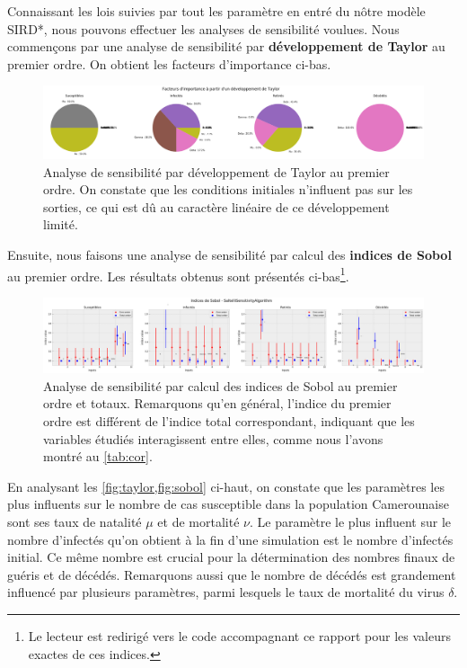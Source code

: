 \documentclass[
  french,
	10pt, %
]{fphw}
\begin{document}
Connaissant les lois suivies par tout les paramètre en entré du nôtre modèle SIRD*, nous pouvons effectuer les analyses de sensibilité voulues. Nous commençons par une analyse de sensibilité par \textbf{développement de Taylor} au premier ordre. On obtient les facteurs d'importance ci-bas. 
\begin{figure}[H]
  \centering
  \includegraphics[width=\linewidth]{taylor.png}
  \caption{Analyse de sensibilité par développement de Taylor au premier ordre. On constate que les conditions initiales n'influent pas sur les sorties, ce qui est dû au caractère linéaire de ce développement limité.}
  \label{fig:taylor}
\end{figure}

Ensuite, nous faisons une analyse de sensibilité par calcul des \textbf{indices de Sobol} au premier ordre. Les résultats obtenus sont présentés ci-bas\footnote{Le lecteur est redirigé vers le code accompagnant ce rapport pour les valeurs exactes de ces indices.}.
\begin{figure}[H]
  \centering
  \includegraphics[width=\linewidth]{sobol.png}
  \caption{Analyse de sensibilité par calcul des indices de Sobol au premier ordre et totaux. Remarquons qu'en général, l'indice du premier ordre est différent de l'indice total correspondant, indiquant que les variables étudiés interagissent entre elles, comme nous l'avons montré au \cref{tab:cor}.}
  \label{fig:sobol}
\end{figure}

En analysant les \cref{fig:taylor,fig:sobol} ci-haut, on constate que les paramètres les plus influents sur le nombre de cas susceptible dans la population Camerounaise sont ses taux de natalité $\mu$ et de mortalité $\nu$. Le paramètre le plus influent sur le nombre d'infectés qu'on obtient à la fin d'une simulation est le nombre d'infectés initial. Ce même nombre est crucial pour la détermination des nombres finaux de guéris et de décédés. Remarquons aussi que le nombre de décédés est grandement influencé par plusieurs paramètres, parmi lesquels le taux de mortalité du virus $\delta$.   
\end{document}
